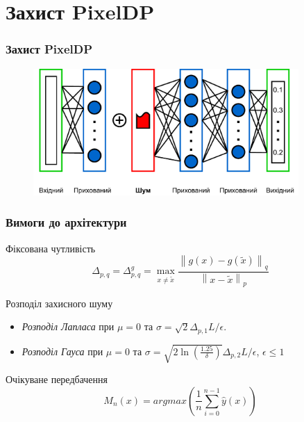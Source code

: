 \documentclass{beamer}
\numberwithin{equation}{section}
\begin{document}
	
	\section{Захист PixelDP}
	\begin{frame}
		\frametitle{Захист PixelDP}
		
		\begin{figure}[h]
			\centering
			\includegraphics[width=0.9\textwidth]{../images/diagrams-PixelDP-small-p.pdf}
			
		\end{figure}
	\end{frame}

	\begin{frame}
		\frametitle{Вимоги до архітектури}
		\begin{block}{Фіксована чутливість}
			 \begin{equation}
				\label{sensitivity}
				\Delta_{p, q}=\Delta_{p, q}^{g}=\max _{x \neq \tilde{x}} \frac{\left\|g(x)-g\left(\tilde{x}\right)\right\|_{q}}{\left\|x-\tilde{x}\right\|_{p}}
			\end{equation}
		\end{block}
	\vspace{0.3cm}
		\begin{block}{Розподіл захисного шуму}
			 \begin{itemize}
				\item \textit{Розподіл Лапласа} при $\mu = 0$ та $\sigma=\sqrt{2} \Delta_{p, 1} L / \epsilon$. 
				\item \textit{Розподіл Гауса} при $\mu = 0$ та $\sigma=\sqrt{2 \ln \left(\frac{1.25}{\delta}\right)} \Delta_{p, 2} L / \epsilon$, $\epsilon \leq 1$
			\end{itemize}
		\end{block}
	\vspace{0.3cm}
		\begin{block}{Очікуване передбачення}
			\begin{equation}
				M_n(x) = argmax\left(\frac{1}{n}\sum\limits_{i = 0}^{n-1}\hat{y}(x)\right)
			\end{equation}
		\end{block}
	    
	\end{frame}
\end{document}

